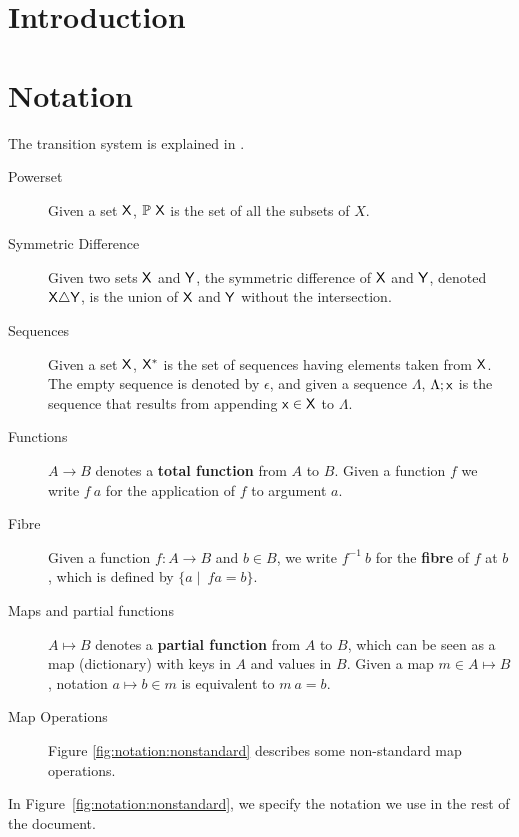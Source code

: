 \documentclass[11pt,a4paper,dvipsnames]{article}
\theoremstyle{definition}
\theoremstyle{definition}
\begin{document}


\tableofcontents
\listoffigures

\section{Introduction}
\label{sec:introduction}


\section{Notation}\label{sec:notation}

The transition system is explained in \cite{small_step_semantics}.

\begin{description}
\item[Powerset] Given a set $\mathsf{X}$, $\mathbb{P}~\mathsf{X}$ is the set of all
  the subsets of $X$.
\item[Symmetric Difference] Given two sets $\mathsf{X}$ and $\mathsf{Y}$,
  the symmetric difference of $\mathsf{X}$ and $\mathsf{Y}$,
  denoted $\mathsf{X}\triangle\mathsf{Y}$, is the union of $\mathsf{X}$ and $\mathsf{Y}$
  without the intersection.
\item[Sequences] Given a set $\mathsf{X}$, $\mathsf{X}^{*}$ is the set of
  sequences having elements taken from $\mathsf{X}$. The empty sequence is
  denoted by $\epsilon$, and given a sequence $\Lambda$, $\Lambda; \mathsf{x}$ is
  the sequence that results from appending $\mathsf{x} \in \mathsf{X}$ to
  $\Lambda$.
\item[Functions] $A \to B$ denotes a \textbf{total function} from $A$ to $B$.
  Given a function $f$ we write $f~a$ for the application of $f$ to argument
  $a$.
\item[Fibre] Given a function $f: A \to B$ and $b\in B$, we write
  $f^{-1}~b$ for the \textbf{fibre} of $f$ at $b$, which is defined by
  $\{a \mid\ f a =  b\}$.
\item[Maps and partial functions] $A \mapsto B$ denotes a \textbf{partial
    function} from $A$ to $B$, which can be seen as a map (dictionary) with
  keys in $A$ and values in $B$. Given a map $m \in A \mapsto B$, notation
  $a \mapsto b \in m$ is equivalent to $m~ a = b$.
\item[Map Operations] Figure \ref{fig:notation:nonstandard}
  describes some non-standard map operations.

\end{description}

In Figure~\ref{fig:notation:nonstandard}, we specify the notation we use in
the rest of the document.
\end{document}
